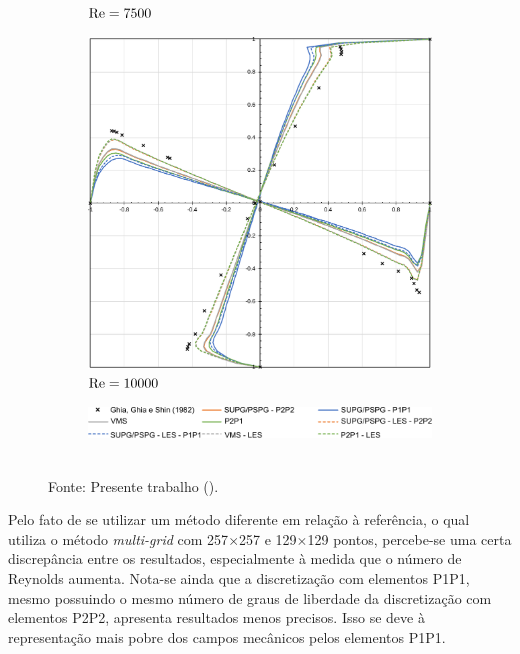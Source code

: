 \begin{figure}[h!]
\begin{subfigure}{0.4\textwidth}
        \caption{$\mathrm{Re}=7500$}
    \end{subfigure}
    \begin{subfigure}{0.4\textwidth}
        \includegraphics[width=\linewidth]{Figuras/Cavity/Re10000.pdf}
        \caption{$\mathrm{Re}=10000$}
    \end{subfigure}
    \begin{subfigure}{\textwidth}
        \centering
        \includegraphics[width=.7\linewidth]{Figuras/Cavity/legenda.pdf}
    \end{subfigure}
    \\Fonte: Presente trabalho (\the\year).
    \label{fig:cavity-results}
\end{figure}

Pelo fato de se utilizar um método diferente em relação à referência, o qual utiliza o método \textit{multi-grid} com 257$\times$257 e 129$\times$129 pontos, percebe-se uma certa discrepância entre os resultados, especialmente à medida que o número de Reynolds aumenta. Nota-se ainda que a discretização com elementos P1P1, mesmo possuindo o mesmo número de graus de liberdade da discretização com elementos P2P2, apresenta resultados menos precisos. Isso se deve à representação mais pobre dos campos mecânicos pelos elementos P1P1.

